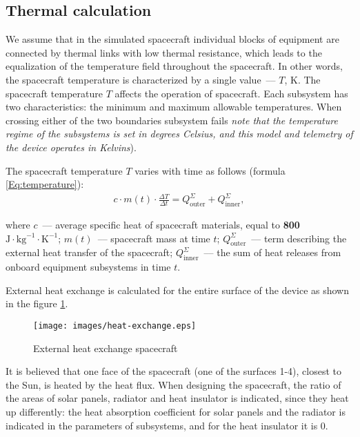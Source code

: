 \documentclass[12pt,a4paper]{article}
\begin{document}
\subsection{Thermal calculation}
\label{Sec:Heat}

We assume that in the simulated spacecraft individual blocks of equipment are connected by thermal links with low thermal resistance, which leads to the equalization of the temperature field throughout the spacecraft. In other words, the spacecraft temperature is characterized by a single value~--– $T$, K. The spacecraft temperature $T$ affects the operation of spacecraft. Each subsystem has two characteristics: the minimum and maximum allowable temperatures. When crossing
either of the two boundaries subsystem fails \emph{note that the temperature regime of the subsystems is set in degrees Celsius, and this model and telemetry of the device operates in Kelvins}).

The spacecraft temperature $T$ varies with time as follows (formula \ref{Eq:temperature}):
\begin{eqnarray}
c \cdot m(t) \cdot \frac{\Delta T}{\Delta t} = Q^{\Sigma}_{\text{outer}} + Q^{\Sigma}_{\text{inner}}, \label{Eq:temperature}
\end{eqnarray}

where $c$~--- average specific heat of spacecraft materials, equal to \textbf{800 $\text{J}
   \cdot \text{kg}^{-1} \cdot \text{K}^{-1}$}; $m(t)$~--– spacecraft mass at time $t$;
$Q^{\Sigma}_{\text{outer}}$~--- term describing the external heat transfer of the spacecraft;
$Q^{\Sigma}_{\text{inner}}$~--– the sum of heat releases from onboard equipment subsystems in time $t$.

External heat exchange is calculated for the entire surface of the device as shown in the figure \ref{Pic:heat-exchange}.

\begin{figure}[tbh]
  \begin{center}
    \texttt{[image: images/heat-exchange.eps]}
    \caption{External heat exchange spacecraft}
    \label{Pic:heat-exchange}
  \end{center}
\end{figure}

It is believed that one face of the spacecraft (one of the surfaces 1-4), closest to the Sun, is heated by the heat flux. When designing the spacecraft, the ratio of the areas of solar panels, radiator and heat insulator is indicated, since they heat up differently: the heat absorption coefficient for solar panels and the radiator is indicated in the parameters of subsystems, and for the heat insulator it is 0.
\end{document}
